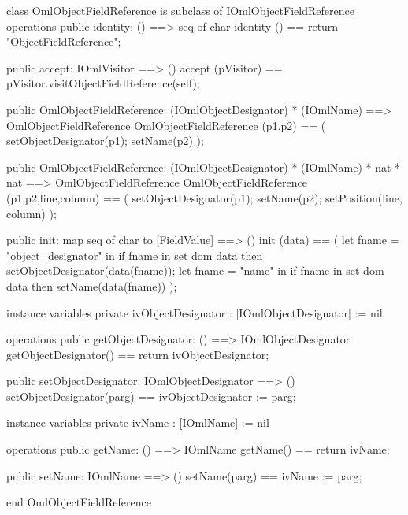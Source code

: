 \begin{vdm_al}
class OmlObjectFieldReference is subclass of IOmlObjectFieldReference
operations
  public identity: () ==> seq of char
  identity () == return "ObjectFieldReference";

  public accept: IOmlVisitor ==> ()
  accept (pVisitor) == pVisitor.visitObjectFieldReference(self);

  public OmlObjectFieldReference:
    (IOmlObjectDesignator) *
    (IOmlName) ==> OmlObjectFieldReference
  OmlObjectFieldReference (p1,p2) == 
    ( setObjectDesignator(p1);
      setName(p2) );

  public OmlObjectFieldReference:
    (IOmlObjectDesignator) *
    (IOmlName) *
    nat *
    nat ==> OmlObjectFieldReference
  OmlObjectFieldReference (p1,p2,line,column) == 
    ( setObjectDesignator(p1);
      setName(p2);
      setPosition(line, column) );

  public init: map seq of char to [FieldValue] ==> ()
  init (data) ==
    ( let fname = "object_designator" in
        if fname in set dom data
        then setObjectDesignator(data(fname));
      let fname = "name" in
        if fname in set dom data
        then setName(data(fname)) );

instance variables
  private ivObjectDesignator : [IOmlObjectDesignator] := nil

operations
  public getObjectDesignator: () ==> IOmlObjectDesignator
  getObjectDesignator() == return ivObjectDesignator;

  public setObjectDesignator: IOmlObjectDesignator ==> ()
  setObjectDesignator(parg) == ivObjectDesignator := parg;

instance variables
  private ivName : [IOmlName] := nil

operations
  public getName: () ==> IOmlName
  getName() == return ivName;

  public setName: IOmlName ==> ()
  setName(parg) == ivName := parg;

end OmlObjectFieldReference
\end{vdm_al}

